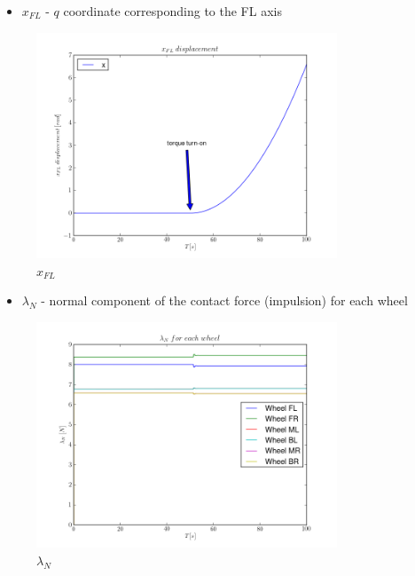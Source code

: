 \begin{itemize}
  \item $x_{FL}$ - $q$ coordinate corresponding to the FL axis
\end{itemize}

\begin{figure}[H]
  \centering
    \includegraphics[width=0.8\textwidth]{xFL}
  \caption{$x_{FL}$}
\end{figure}

\begin{itemize}
  \item $\lambda_{N}$ - normal component of the contact force (impulsion) for each wheel
\end{itemize}

\begin{figure}[H]
  \centering
    \includegraphics[width=0.8\textwidth]{lambdaN2}
  \caption{$\lambda_{N}$}
\end{figure}

